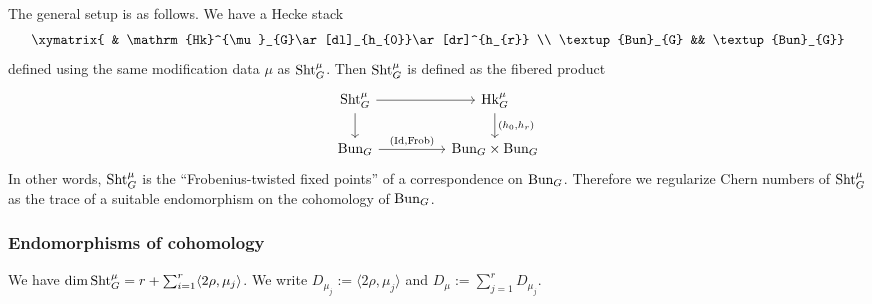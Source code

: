 \documentclass[reqno]{amsart}
\numberwithin{equation}{subsection}
\theoremstyle{definition}
\newcommand{\Bun}{\textup{Bun}}
\newcommand\Frob{\textup{Frob}}
\newcommand\Hk{\mathrm{Hk}}
\newcommand\Sht{\textup{Sht}}
\renewcommand{\j}[1]{\langle{#1}\rangle}
\renewcommand\r\rho
\DeclareMathOperator{\Id}{Id}
\begin{document}
The general setup is as follows. We have a Hecke stack 
\begin{equation*}
\xymatrix{ & \Hk^{\mu}_{G}\ar[dl]_{h_{0}}\ar[dr]^{h_{r}} \\
\Bun_{G} && \Bun_{G}}
\end{equation*}
defined using the same modification data $\mu$ as $\Sht^{\mu}_{G}$. Then $\Sht^{\mu}_{G}$ is defined as the fibered product 
\begin{equation}\label{eq:intro-shtukas}
\begin{tikzcd}[column sep = huge]
\Sht^{\mu}_G \ar[r] \ar[d] & \Hk_G^{\mu} \ar[d, "{(h_0, h_r)}"] \\
\Bun_G \ar[r, "{(\Id, \Frob)}"] & \Bun_G \times \Bun_G    
\end{tikzcd}
\end{equation}
In other words, $\Sht^\mu_G$ is the ``Frobenius-twisted fixed points'' of a correspondence on $\Bun_G$. Therefore we regularize Chern numbers of $\Sht_G^\mu$
as the trace of a suitable endomorphism on the cohomology of $\Bun_G$.






\subsubsection{Endomorphisms of cohomology} We have $\dim \Sht^{\mu}_{G}=r+\sum_{i=1}^{r}\j{2\r,\mu_{j}}$. We write $D_{\mu_j} := \j{2\r,\mu_{j}}$ and $D_\mu := \sum_{j=1}^r D_{\mu_j}$.
\end{document}
